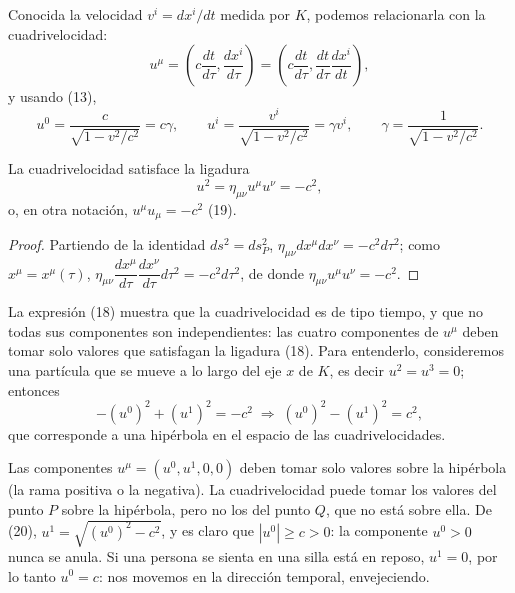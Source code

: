 Conocida la velocidad $v^i=dx^i/dt$ medida por $K$, podemos
relacionarla con la cuadrivelocidad:
\[
u^\mu = \left(c\frac{dt}{d\tau},\frac{dx^i}{d\tau}\right) =
\left(c\frac{dt}{d\tau},\frac{dt}{d\tau}\frac{dx^i}{dt}\right),
\]
y usando (13),
\[
u^0 = \frac{c}{\sqrt{1-v^2/c^2}} = c\gamma, \qquad u^i =
\frac{v^i}{\sqrt{1-v^2/c^2}} = \gamma v^i, \qquad
\gamma=\frac{1}{\sqrt{1-v^2/c^2}}. \tag{16, 17}
\]

\begin{proposicionc}
La cuadrivelocidad satisface la ligadura
\[
u^2 = \eta_{\mu\nu}u^\mu u^\nu = -c^2, \tag{18}
\]
o, en otra notación, $u^\mu u_\mu=-c^2$ (19).
\end{proposicionc}

\begin{proof}
Partiendo de la identidad $ds^2=ds_P^2$, $\eta_{\mu\nu}dx^\mu dx^\nu=
-c^2d\tau^2$; como $x^\mu=x^\mu(\tau)$,
$\eta_{\mu\nu}\dfrac{dx^\mu}{d\tau}\dfrac{dx^\nu}{d\tau}d\tau^2=
-c^2d\tau^2$, de donde $\eta_{\mu\nu}u^\mu u^\nu=-c^2$. \qedhere
\end{proof}

La expresión (18) muestra que la cuadrivelocidad es de tipo tiempo, y
que no todas sus componentes son independientes: las cuatro componentes
de $u^\mu$ deben tomar solo valores que satisfagan la ligadura (18).
Para entenderlo, consideremos una partícula que se mueve a lo largo del
eje $x$ de $K$, es decir $u^2=u^3=0$; entonces
\[
-(u^0)^2+(u^1)^2=-c^2 \;\Longrightarrow\; (u^0)^2-(u^1)^2=c^2, \tag{20}
\]
que corresponde a una hipérbola en el espacio de las cuadrivelocidades.

\begin{center}
\end{center}

Las componentes $u^\mu=(u^0,u^1,0,0)$ deben tomar solo valores sobre la
hipérbola (la rama positiva o la negativa). La cuadrivelocidad puede
tomar los valores del punto $P$ sobre la hipérbola, pero no los del
punto $Q$, que no está sobre ella. De (20), $u^1=\sqrt{(u^0)^2-c^2}$, y
es claro que $|u^0|\ge c>0$: la componente $u^0>0$ nunca se anula. Si una
persona se sienta en una silla está en reposo, $u^1=0$, por lo tanto
$u^0=c$: nos movemos en la dirección temporal, envejeciendo.

